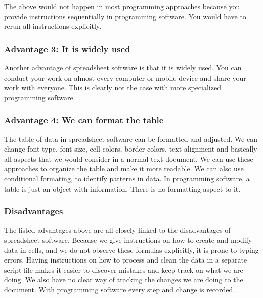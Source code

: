 \documentclass[]{book}
\begin{document}
The above would not happen in most programming approaches because you provide instructions sequentially in programming software. You would have to rerun all instructions explicitly.

\hypertarget{advantage-3-it-is-widely-used}{%
\subsubsection*{Advantage 3: It is widely used}\label{advantage-3-it-is-widely-used}}

Another advantage of spreadsheet software is that it is widely used. You can conduct your work on almost every computer or mobile device and share your work with everyone. This is clearly not the case with more specialized programming software.

\hypertarget{advantage-4-we-can-format-the-table}{%
\subsubsection*{Advantage 4: We can format the table}\label{advantage-4-we-can-format-the-table}}

The table of data in spreadsheet software can be formatted and adjusted. We can change font type, font size, cell colors, border colors, text alignment and basically all aspects that we would consider in a normal text document. We can use these approaches to organize the table and make it more readable. We can also use conditional formating, to identify patterns in data. In programming software, a table is just an object with information. There is no formatting aspect to it.

\hypertarget{disadvantages}{%
\subsubsection*{Disadvantages}\label{disadvantages}}

The listed advantages above are all closely linked to the disadvantages of spreadsheet software. Because we give instructions on how to create and modify data in cells, and we do not observe these formulas explicitly, it is prone to typing errors. Having instructions on how to process and clean the data in a separate script file makes it easier to discover mistakes and keep track on what we are doing. We also have no clear way of tracking the changes we are doing to the document. With programming software every step and change is recorded.
\end{document}
